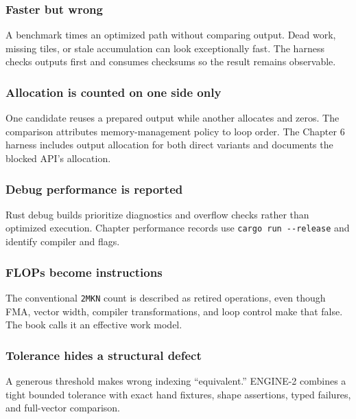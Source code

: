 \documentclass[
  10pt,
]{article}
\begin{document}
\subsubsection{Faster but wrong}\label{faster-but-wrong}

A benchmark times an optimized path without comparing output. Dead work,
missing tiles, or stale accumulation can look exceptionally fast. The
harness checks outputs first and consumes checksums so the result
remains observable.

\subsubsection{Allocation is counted on one side
only}\label{allocation-is-counted-on-one-side-only}

One candidate reuses a prepared output while another allocates and
zeros. The comparison attributes memory-management policy to loop order.
The Chapter 6 harness includes output allocation for both direct
variants and documents the blocked API's allocation.

\subsubsection{Debug performance is
reported}\label{debug-performance-is-reported}

Rust debug builds prioritize diagnostics and overflow checks rather than
optimized execution. Chapter performance records use
\texttt{cargo\ run\ -\/-release} and identify compiler and flags.

\subsubsection{FLOPs become
instructions}\label{flops-become-instructions}

The conventional \texttt{2MKN} count is described as retired operations,
even though FMA, vector width, compiler transformations, and loop
control make that false. The book calls it an effective work model.

\subsubsection{Tolerance hides a structural
defect}\label{tolerance-hides-a-structural-defect}

A generous threshold makes wrong indexing ``equivalent.'' ENGINE-2
combines a tight bounded tolerance with exact hand fixtures, shape
assertions, typed failures, and full-vector comparison.
\end{document}
